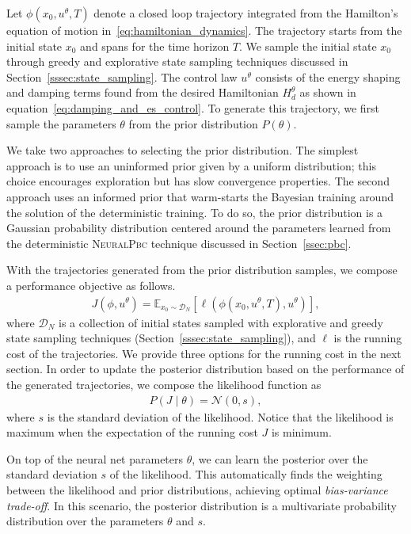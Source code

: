 Let $\phi(x_0, u^\theta, T)$ denote a closed loop trajectory integrated from the Hamilton's equation of motion in~\eqref{eq:hamiltonian_dynamics}.
The trajectory starts from the initial state $x_0$ and spans for the time horizon $T$.
%
We sample the initial state $x_0$ through greedy and explorative state sampling techniques discussed in Section~\ref{sssec:state_sampling}.
The control law $u^\theta$ consists of the energy shaping and damping terms found from the desired Hamiltonian $H^\theta_d$ as shown in equation~\eqref{eq:damping_and_es_control}.
%
To generate this trajectory, we first sample the parameters $\theta$ from the prior distribution $P(\theta)$.
%

We take two approaches to selecting the prior distribution.
The simplest approach is to use an uninformed prior given by a uniform distribution;
this choice encourages
exploration but has slow convergence properties. The second approach uses an
informed prior that warm-starts the Bayesian training around the solution of the
deterministic training. To do so, the prior
distribution is a Gaussian probability distribution centered around the parameters learned from the deterministic
\textsc{NeuralPbc} technique discussed in Section~\ref{ssec:pbc}.

With the trajectories generated from the prior distribution samples, we compose a performance objective as follows.
\begin{align*}
    J(\phi, u^\theta) = \mathbb{E}_{x_0 \sim \mathcal{D}_N}[ \ell(\phi(x_0, u^\theta, T), u^\theta)], 
\end{align*}
\noindent where $\mathcal{D}_N$ is a collection of initial states sampled with explorative and greedy state sampling techniques (Section~\ref{sssec:state_sampling}), and
$\ell$ is the running cost of the trajectories. We provide three options for the running cost in the next section.
%
In order to update the posterior distribution based on the performance of the generated trajectories, we compose the likelihood function as
\begin{align}
    P(J \mid \theta) = \mathcal{N}\left(0, s \right), 
    \label{eqn:likelihood_neuralpbc}
\end{align}
\noindent where $s$ is the standard deviation of the likelihood.
%
Notice that the likelihood is maximum when the expectation of the running cost $J$ is minimum.
%
\begin{rem}
    On top of the neural net parameters $\theta$, we can learn the posterior
    over the standard deviation $s$ of the likelihood. 
    This automatically finds the weighting between the likelihood and prior distributions, achieving optimal \textit{bias-variance trade-off}.
    In this scenario, the posterior distribution is a multivariate probability distribution over the parameters $\theta$ and $s$. 
\end{rem}


